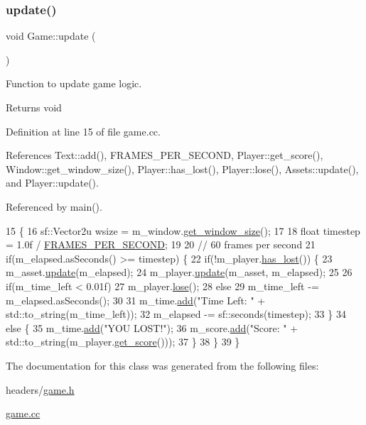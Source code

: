 \subsubsection{\texorpdfstring{update()}{update()}}
{\footnotesize\ttfamily void Game\+::update (\begin{DoxyParamCaption}{ }\end{DoxyParamCaption})}



Function to update game logic. 

\begin{DoxyReturn}{Returns}
void 
\end{DoxyReturn}


Definition at line 15 of file game.\+cc.



References Text\+::add(), F\+R\+A\+M\+E\+S\+\_\+\+P\+E\+R\+\_\+\+S\+E\+C\+O\+ND, Player\+::get\+\_\+score(), Window\+::get\+\_\+window\+\_\+size(), Player\+::has\+\_\+lost(), Player\+::lose(), Assets\+::update(), and Player\+::update().



Referenced by main().


\begin{DoxyCode}
15                   \{
16     sf::Vector2u wsize = m\_window.\hyperlink{class_window_a44853817aa046240897d0ce78003bacd}{get\_window\_size}();
17 
18     \textcolor{keywordtype}{float} timestep = 1.0f / \hyperlink{game_8h_a85f9d29551f1bf30f03229da27cb532f}{FRAMES\_PER\_SECOND};
19 
20     \textcolor{comment}{// 60 frames per second}
21     \textcolor{keywordflow}{if}(m\_elapsed.asSeconds() >= timestep) \{
22         \textcolor{keywordflow}{if}(!m\_player.\hyperlink{class_player_a734ead9fd1aa89c2574310425da18dc7}{has\_lost}()) \{
23             m\_asset.\hyperlink{class_assets_a6af3226d6a6960be5260e9edc22cf665}{update}(m\_elapsed);
24             m\_player.\hyperlink{class_player_a83282cabf0d698e16fe452759c50712c}{update}(m\_asset, m\_elapsed);
25             
26             \textcolor{keywordflow}{if}(m\_time\_left < 0.01f)
27                 m\_player.\hyperlink{class_player_af1ae3d8d7e22c5502d0380c16c7329ef}{lose}();
28             \textcolor{keywordflow}{else}
29                 m\_time\_left -= m\_elapsed.asSeconds();
30             
31             m\_time.\hyperlink{class_text_ab5f6fabb3e5e029ed0e42d21757c9521}{add}(\textcolor{stringliteral}{"Time Left: "} + std::to\_string(m\_time\_left));
32             m\_elapsed -= sf::seconds(timestep);
33         \}
34         \textcolor{keywordflow}{else} \{
35             m\_time.\hyperlink{class_text_ab5f6fabb3e5e029ed0e42d21757c9521}{add}(\textcolor{stringliteral}{"YOU LOST!"});
36             m\_score.\hyperlink{class_text_ab5f6fabb3e5e029ed0e42d21757c9521}{add}(\textcolor{stringliteral}{"Score: "} + std::to\_string(m\_player.\hyperlink{class_player_ad65c379a083e7c6656721616f8784059}{get\_score}()));
37         \}
38     \}
39 \}
\end{DoxyCode}


The documentation for this class was generated from the following files\+:\begin{DoxyCompactItemize}
\item 
headers/\hyperlink{game_8h}{game.\+h}\item 
\hyperlink{game_8cc}{game.\+cc}\end{DoxyCompactItemize}
